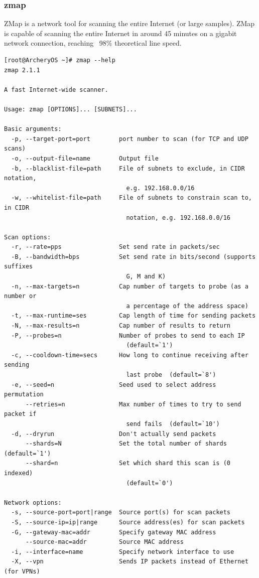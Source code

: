 \documentclass{article}
\begin{document}
\subsubsection{zmap}
ZMap is a network tool for scanning the entire Internet (or large samples). ZMap is capable of scanning the entire Internet in around 45 minutes on a gigabit network connection, reaching ~98\% theoretical line speed.
\begin{lstlisting}
[root@ArcheryOS ~]# zmap --help
zmap 2.1.1

A fast Internet-wide scanner.

Usage: zmap [OPTIONS]... [SUBNETS]...

Basic arguments:
  -p, --target-port=port        port number to scan (for TCP and UDP scans)
  -o, --output-file=name        Output file
  -b, --blacklist-file=path     File of subnets to exclude, in CIDR notation,
                                  e.g. 192.168.0.0/16
  -w, --whitelist-file=path     File of subnets to constrain scan to, in CIDR
                                  notation, e.g. 192.168.0.0/16

Scan options:
  -r, --rate=pps                Set send rate in packets/sec
  -B, --bandwidth=bps           Set send rate in bits/second (supports suffixes
                                  G, M and K)
  -n, --max-targets=n           Cap number of targets to probe (as a number or
                                  a percentage of the address space)
  -t, --max-runtime=ses         Cap length of time for sending packets
  -N, --max-results=n           Cap number of results to return
  -P, --probes=n                Number of probes to send to each IP
                                  (default=`1')
  -c, --cooldown-time=secs      How long to continue receiving after sending
                                  last probe  (default=`8')
  -e, --seed=n                  Seed used to select address permutation
      --retries=n               Max number of times to try to send packet if
                                  send fails  (default=`10')
  -d, --dryrun                  Don't actually send packets
      --shards=N                Set the total number of shards  (default=`1')
      --shard=n                 Set which shard this scan is (0 indexed)
                                  (default=`0')

Network options:
  -s, --source-port=port|range  Source port(s) for scan packets
  -S, --source-ip=ip|range      Source address(es) for scan packets
  -G, --gateway-mac=addr        Specify gateway MAC address
      --source-mac=addr         Source MAC address
  -i, --interface=name          Specify network interface to use
  -X, --vpn                     Sends IP packets instead of Ethernet (for VPNs)


\end{lstlisting}
\end{document}
